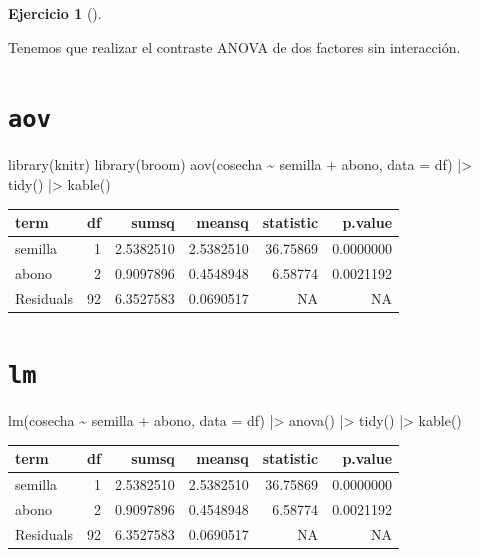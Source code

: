 \documentclass[
  a4paper,
]{scrreport}
\newenvironment{Shaded}{\begin{snugshade}}{\end{snugshade}}
\newcommand{\AttributeTok}[1]{\textcolor[rgb]{0.40,0.45,0.13}{#1}}
\newcommand{\FunctionTok}[1]{\textcolor[rgb]{0.28,0.35,0.67}{#1}}
\newcommand{\NormalTok}[1]{\textcolor[rgb]{0.00,0.23,0.31}{#1}}
\newcommand{\SpecialCharTok}[1]{\textcolor[rgb]{0.37,0.37,0.37}{#1}}
\theoremstyle{definition}
\newtheorem{exercise}{Ejercicio}[chapter]
\theoremstyle{remark}
\begin{document}
\begin{exercise}[]
\begin{enumerate}
\begin{tcolorbox}
  Tenemos que realizar el contraste ANOVA de dos factores sin
  interacción.

  \section{\texorpdfstring{\texttt{aov}}{aov}}

\begin{Shaded}
\begin{Highlighting}[]
\FunctionTok{library}\NormalTok{(knitr)}
\FunctionTok{library}\NormalTok{(broom)}
\FunctionTok{aov}\NormalTok{(cosecha }\SpecialCharTok{\textasciitilde{}}\NormalTok{ semilla }\SpecialCharTok{+}\NormalTok{ abono, }\AttributeTok{data =}\NormalTok{ df) }\SpecialCharTok{|\textgreater{}} 
    \FunctionTok{tidy}\NormalTok{() }\SpecialCharTok{|\textgreater{}} 
    \FunctionTok{kable}\NormalTok{()}
\end{Highlighting}
\end{Shaded}

  \begin{longtable}[]{@{}lrrrrr@{}}
  \toprule\noalign{}
  term & df & sumsq & meansq & statistic & p.value \\
  \midrule\noalign{}
  \endhead
  \bottomrule\noalign{}
  \endlastfoot
  semilla & 1 & 2.5382510 & 2.5382510 & 36.75869 & 0.0000000 \\
  abono & 2 & 0.9097896 & 0.4548948 & 6.58774 & 0.0021192 \\
  Residuals & 92 & 6.3527583 & 0.0690517 & NA & NA \\
  \end{longtable}

  \section{\texorpdfstring{\texttt{lm}}{lm}}

\begin{Shaded}
\begin{Highlighting}[]
\FunctionTok{lm}\NormalTok{(cosecha }\SpecialCharTok{\textasciitilde{}}\NormalTok{ semilla }\SpecialCharTok{+}\NormalTok{ abono, }\AttributeTok{data =}\NormalTok{ df) }\SpecialCharTok{|\textgreater{}} 
    \FunctionTok{anova}\NormalTok{() }\SpecialCharTok{|\textgreater{}} 
    \FunctionTok{tidy}\NormalTok{() }\SpecialCharTok{|\textgreater{}} 
    \FunctionTok{kable}\NormalTok{()}
\end{Highlighting}
\end{Shaded}

  \begin{longtable}[]{@{}lrrrrr@{}}
  \toprule\noalign{}
  term & df & sumsq & meansq & statistic & p.value \\
  \midrule\noalign{}
  \endhead
  \bottomrule\noalign{}
  \endlastfoot
  semilla & 1 & 2.5382510 & 2.5382510 & 36.75869 & 0.0000000 \\
  abono & 2 & 0.9097896 & 0.4548948 & 6.58774 & 0.0021192 \\
  Residuals & 92 & 6.3527583 & 0.0690517 & NA & NA \\
  \end{longtable}


\end{tcolorbox}
\end{enumerate}
\end{exercise}
\end{document}
